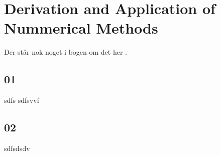 \section{Derivation and Application of Nummerical Methods}
Der står nok noget i bogen om det her \cite{Bogen}.
\subsection*{01}
sdfs sdfsvvf

\subsection*{02}
sdfsdsdv
